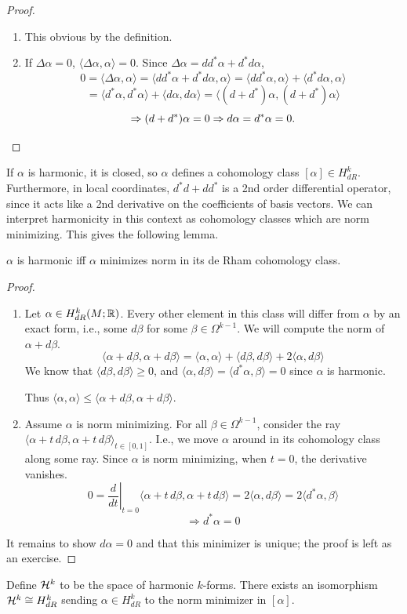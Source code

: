 \documentclass[main]{subfiles}
\begin{document}
\begin{proof}
\leavevmode
\begin{enumerate}
\item[($\Leftarrow$)]This obvious by the definition.
\item[($\Rightarrow$)] If $\Delta\alpha=0$, $\langle\Delta\alpha,\alpha\rangle = 0$. Since $\Delta\alpha = dd^\ast\alpha + d^\ast d\alpha$,
\[
0 = \langle \Delta\alpha,\alpha\rangle = \langle dd^\ast\alpha + d^\ast d\alpha,\alpha\rangle = \langle dd^\ast\alpha,\alpha\rangle + \langle d^\ast d\alpha,\alpha\rangle
\]
\[
= \langle d^\ast\alpha,d^\ast\alpha\rangle + \langle d\alpha,d\alpha\rangle = \langle (d+d^\ast)\alpha,(d+d^\ast)\alpha\rangle
\]
\[
\Rightarrow (d+d^\ast)\alpha = 0 \Rightarrow d\alpha = d^\ast\alpha = 0. \qedhere
\]
\end{enumerate}
\end{proof}
If $\alpha$ is harmonic, it is closed, so $\alpha$ defines a cohomology class $[\alpha]\in H^k_{dR}$.
Furthermore, in local coordinates, $d^\ast d + dd^\ast$ is a 2nd order differential operator, since it acts like a 2nd derivative on the coefficients of basis vectors.
We can interpret harmonicity in this context as cohomology classes which are norm minimizing. This gives the following lemma.


\begin{lemma}
$\alpha$ is harmonic iff $\alpha$ minimizes norm in its de Rham cohomology class.
\end{lemma}

\begin{proof} 
	\begin{enumerate}
		\item [($\Rightarrow$)]Let $\alpha \in H^k_{dR}(M;\mathbb R)$. Every other element in this class will differ from $\alpha$ by an exact form, i.e., some $d\beta$ for some $\beta\in\Omega^{k-1}$. We will compute the norm of $\alpha+d\beta$.
\[
\langle \alpha+d\beta,\alpha+d\beta\rangle = \langle \alpha,\alpha\rangle + \langle d\beta,d\beta\rangle + 2\langle \alpha,d\beta\rangle
\]
We know that $\langle d\beta,d\beta\rangle \geq 0$, and $\langle \alpha,d\beta\rangle = \langle d^\ast\alpha,\beta\rangle = 0$ since $\alpha$ is harmonic.

Thus $\langle \alpha,\alpha\rangle \leq \langle \alpha+d\beta,\alpha+d\beta\rangle$.
\item[($\Leftarrow$)]
Assume $\alpha$ is norm minimizing. For all $\beta\in\Omega^{k-1}$, consider the ray $\langle \alpha+t\,d\beta,\alpha+t\,d\beta\rangle_{t\in[0,1]}$. I.e., we move $\alpha$ around in its cohomology class along some ray. Since $\alpha$ is norm minimizing, when $t=0$, the derivative vanishes.
\[
0 = \left.\frac{d}{dt}\right|_{t=0}\langle \alpha+t\,d\beta,\alpha+t\,d\beta\rangle = 2\langle \alpha,d\beta\rangle = 2\langle d^\ast\alpha,\beta\rangle
\]
\[
\Rightarrow d^\ast\alpha = 0
\]
\end{enumerate}
It remains to show $d\alpha=0$ and that this minimizer is unique; the proof is left as an exercise. \qedhere
\end{proof}

\begin{theorem}
Define $\mathcal{H}^k$ to be the space of harmonic $k$-forms. There exists an isomorphism $\mathcal{H}^k \cong H^k_{dR}$ sending $\alpha \in H^k_{dR}$ to the norm minimizer in $[\alpha]$.
\end{theorem}
\end{document}
